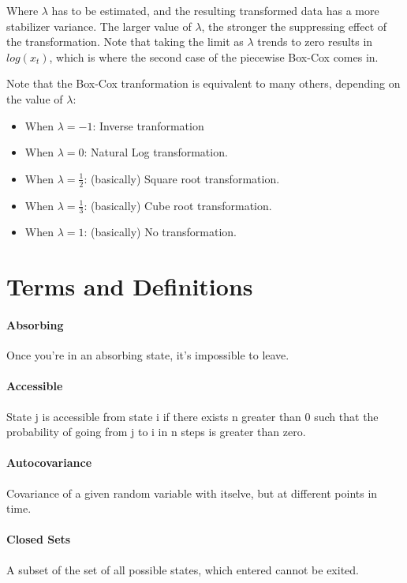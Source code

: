 \documentclass[12pt]{article}
\begin{document}
Where $\lambda$ has to be estimated, and the resulting transformed data has a more stabilizer variance. 
The larger value of $\lambda$, the stronger the suppressing effect of the transformation.
Note that taking the limit as $\lambda$ trends to zero results in $log(x_t)$, which is where
the second case of the piecewise Box-Cox comes in.

Note that the Box-Cox tranformation is equivalent to many others, depending on the value of $\lambda$:
\begin{itemize}
    \item When $\lambda = -1$: Inverse tranformation
    \item When $\lambda = 0$: Natural Log transformation.
    \item When $\lambda = \frac{1}{2}$: (basically) Square root transformation.
    \item When $\lambda = \frac{1}{3}$: (basically) Cube root transformation.
    \item When $\lambda = 1$: (basically) No transformation.
\end{itemize}





\section{Terms and Definitions}
    \paragraph{Absorbing} Once you're in an absorbing state, it's impossible to leave.
    \paragraph{Accessible} State j is accessible from state i if there exists n greater than 0 such that the probability of going from j to i in n steps is greater than zero.
    \paragraph{Autocovariance} Covariance of a given random variable with itselve, but at different points in time.
    \paragraph{Closed Sets} A subset of the set of all possible states, which entered cannot be exited.
\end{document}
